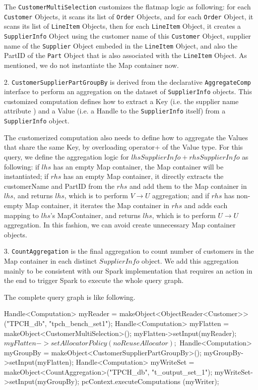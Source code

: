 The
\texttt{CustomerMultiSelection} customizes the flatmap logic as
following: for each \texttt{Customer} Objects, it scans its list of
\texttt{Order} Objects, and for each \texttt{Order} Object, it scans
its list of \texttt{LineItem} Objects, then for each \texttt{LineItem}
Object, it creates a \texttt{SupplierInfo} Object using the customer
name of this \texttt{Customer} Object, supplier name of the
\texttt{Supplier} Object embeded in the \texttt{LineItem} Object, and
also the PartID of the \texttt{Part} Object that is also associated with
the \texttt{LineItem} Object. As mentioned, we do not instantiate the Map container
now.

\vspace{5pt}
2. \texttt{CustomerSupplierPartGroupBy} is derived from the declarative
\texttt{AggregateComp} interface to perform an aggregation on the
dataset of \texttt{SupplierInfo} objects. This customized computation
defines how to extract a Key (i.e. the supplier name attribute
) and a Value (i.e. a Handle to the \texttt{SupplierInfo} itself) from a
\texttt{SupplierInfo} object. 

The customerized computation also needs
to define how to aggregate the Values that share the same Key,  by
overloading operator+ of the Value type. For this query, we define the aggregation
logic for $lhsSupplierInfo + rhsSupplierInfo$ as following: if $lhs$
has an empty Map container, the Map container will be instantiated; if
$rhs$ has an empty Map container, it directly extracts the
customerName and PartID from the $rhs$ and add them to the Map container in $lhs$, and
returns $lhs$, which is to perform $V \rightarrow U$ aggregation;
and if $rhs$ has non-empty Map container, it iterates the Map
container in $rhs$ and adds each mapping to $lhs$'s MapContainer, and
returns $lhs$,
which is to perform $U \rightarrow U$ aggregation. In this fashion, we can
avoid create unnecessary Map container objects.

\vspace{5pt}
3. \texttt{CountAggregation} is the final aggregation to count number
of customers in the Map
container in each distinct $SupplierInfo$ object. We add this
aggregation mainly to be consistent with our Spark implementation
that requires an action in the end to trigger Spark to execute the
whole query graph.

\vspace{5pt}
The complete query graph is like following. 

\begin{code}
    Handle<Computation> myReader = 
        makeObject<ObjectReader<Customer>>("TPCH_db", "tpch_bench_set1");
    Handle<Computation> myFlatten = makeObject<CustomerMultiSelection>();
    myFlatten->setInput(myReader);
    $myFlatten->setAllocatorPolicy(noReuseAllocator);$
    Handle<Computation> myGroupBy = makeObject<CustomerSupplierPartGroupBy>();
    myGroupBy->setInput(myFlatten);
    Handle<Computation> myWriteSet = 
        makeObject<CountAggregation>("TPCH_db", "t_output_set_1");
    myWriteSet->setInput(myGroupBy);
    pcContext.executeComputations (myWriter);
\end{code}

